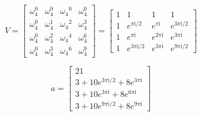 \documentclass[11pt]{article}
\begin{document}
\[ V = 
     \begin{bmatrix} \omega_4^{0} & \omega_4^{0} & {\omega_4}^{0} & \omega_4^{0}
     \\ \omega_4^{0} & \omega_4^{1} & {\omega_4}^{2} & \omega_4^{3}
     \\ \omega_4^{0} & \omega_4^{2} & {\omega_4}^{4} & \omega_4^{6}
     \\  \omega_4^{0} & \omega_4^{3} & {\omega_4}^{6} & \omega_4^{9}
     \end{bmatrix} = 
     \begin{bmatrix} 1 & 1 & 1 & 1 
     \\ 1 & e^{{\pi\mathrm{i}}/2} & e^{\pi\mathrm{i}} & e^{{3\pi\mathrm{i}}/2}
     \\ 1 & e^{\pi\mathrm{i}} & e^{2\pi\mathrm{i}} & e^{3\pi\mathrm{i}}
     \\ 1 & e^{{3\pi\mathrm{i}}/2} & e^{3\pi\mathrm{i}} & e^{{9\pi\mathrm{i}}/2}
     \end{bmatrix}\]

\[a = \begin{bmatrix}
     21
     \\ 3 + 10e^{{3\pi\mathrm{i}}/2} + 8e^{3\pi\mathrm{i}}
     \\ 3 + 10e^{3\pi\mathrm{i}} + 8e^{6\pi\mathrm{i}}
     \\ 3 + 10e^{{9\pi\mathrm{i}}/2} + 8e^{9\pi\mathrm{i}}
     \end{bmatrix}\]
\end{document}
